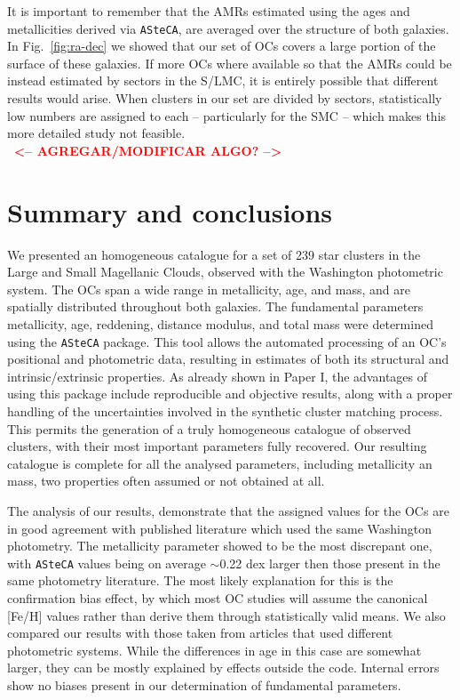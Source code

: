 \documentclass[a4paper,fleqn,usenatbib]{mnras}
\newcommand{\cmmt}[1]{\textcolor{red}{\textbf{$\;\;$<-- #1 -->$\;\;$}}}
\begin{document}
It is important to remember that the AMRs estimated using the ages and
metallicities derived via \texttt{ASteCA}, are averaged over the structure of
both galaxies. In Fig.~\ref{fig:ra-dec} we showed that our set of OCs covers a
large portion of the surface of these galaxies.
%
If more OCs where available so that the AMRs could be instead
estimated by sectors in the S/LMC, it is entirely possible that different
results would arise. When clusters in our set are divided by sectors,
statistically low numbers are assigned to each -- particularly for the SMC --
which makes this more detailed study not feasible.\\

\cmmt{AGREGAR/MODIFICAR ALGO?}





\section{Summary and conclusions}
\label{sec:summ-concl}

We presented an homogeneous catalogue for a set of 239 star clusters in the
Large and Small Magellanic Clouds, observed with the Washington photometric
system. The OCs span a wide range in metallicity, age, and mass, and are
spatially distributed throughout both galaxies.
%
The fundamental parameters metallicity, age, reddening, distance modulus, and
total mass were determined using the \texttt{ASteCA} package.
%
This tool allows the automated processing of an OC's positional and photometric
data, resulting in estimates of both its structural and intrinsic/extrinsic
properties.
%
As already shown in Paper I, the advantages of using this package include
reproducible and objective results, along with a proper handling of the
uncertainties involved in the synthetic cluster matching process.
%
This permits the generation of a truly homogeneous catalogue of observed
clusters, with their most important parameters fully recovered.
%
Our resulting catalogue is complete for all the analysed parameters, including
metallicity an mass, two properties often assumed or not obtained at all.

The analysis of our results, demonstrate that the assigned values for the OCs
are in good agreement with published literature which used the same
Washington photometry.
%
The metallicity parameter showed to be the most discrepant one, with \texttt
{ASteCA} values being on average ${\sim}$0.22 dex larger then those present in
the same photometry literature. The most likely explanation for this is the
confirmation bias effect, by which most OC studies will assume the canonical 
[Fe/H] values rather than derive them through statistically valid means.
%
We also compared our results with those taken from articles that used different
photometric systems. While the differences in age in this case are somewhat
larger, they can be mostly explained by effects outside the code.
Internal errors show no biases present in our determination of fundamental
parameters.
\end{document}
